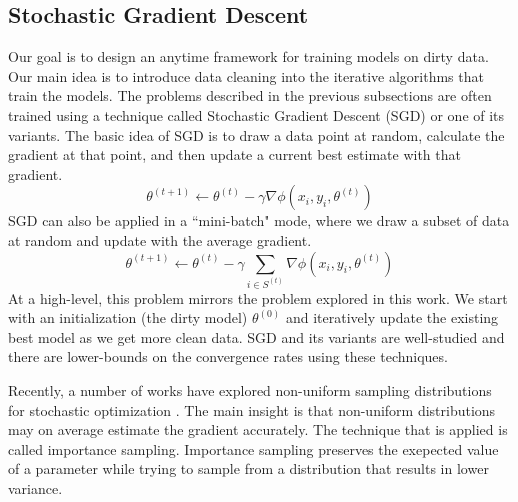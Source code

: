 \subsection{Stochastic Gradient Descent}
Our goal is to design an anytime framework for training models on dirty data.
Our main idea is to introduce data cleaning into the iterative algorithms that train the models. 
The problems described in the previous subsections are often trained using a technique called Stochastic Gradient Descent (SGD) or one of its variants.
The basic idea of SGD is to draw a data point at random, calculate the gradient at that point, and then update a current best estimate with that gradient.
\[
\theta^{(t+1)}\leftarrow\theta^{(t)}-\gamma\nabla\phi(x_{i},y_{i},\theta^{(t)})
\]
 SGD can also be applied in a ``mini-batch" mode, where we draw a subset of data at random and update with the average gradient.
 \[
 \theta^{(t+1)}\leftarrow\theta^{(t)}-\gamma\sum_{i\in S^{(t)}}\nabla\phi(x_{i},y_{i},\theta^{(t)})
 \]
 At a high-level, this problem mirrors the problem explored in this work. We start with an initialization (the dirty model) $\theta^{(0)}$ and iteratively update the existing best model as we get more clean data. 
SGD and its variants are well-studied and there are lower-bounds on the convergence rates using these techniques. 

Recently, a number of works have explored non-uniform sampling distributions for stochastic optimization \cite{zhao2014stochastic, qu2014randomized}.
The main insight is that non-uniform distributions may on average estimate the gradient accurately.
The technique that is applied is called importance sampling.
Importance sampling preserves the exepected value of a parameter while trying to sample from a distribution that results in lower variance.





 